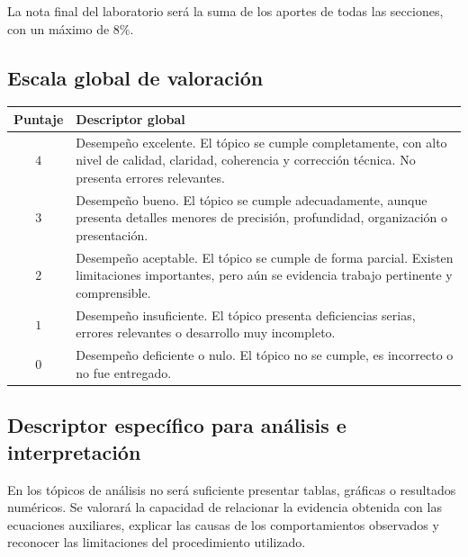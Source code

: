 \documentclass[12pt]{article}
\begin{document}
La nota final del laboratorio será la suma de los aportes de todas las secciones, con un máximo de \(8\%\).

\subsection*{Escala global de valoración}

\renewcommand{\arraystretch}{1.2}
\setlength{\tabcolsep}{4pt}

\begin{center}
\begin{tabular}{|c|p{12cm}|}
\hline
\textbf{Puntaje} & \textbf{Descriptor global} \\
\hline
\(4\) & Desempeño excelente. El tópico se cumple completamente, con alto nivel de calidad, claridad, coherencia y corrección técnica. No presenta errores relevantes. \\
\hline
\(3\) & Desempeño bueno. El tópico se cumple adecuadamente, aunque presenta detalles menores de precisión, profundidad, organización o presentación. \\
\hline
\(2\) & Desempeño aceptable. El tópico se cumple de forma parcial. Existen limitaciones importantes, pero aún se evidencia trabajo pertinente y comprensible. \\
\hline
\(1\) & Desempeño insuficiente. El tópico presenta deficiencias serias, errores relevantes o desarrollo muy incompleto. \\
\hline
\(0\) & Desempeño deficiente o nulo. El tópico no se cumple, es incorrecto o no fue entregado. \\
\hline
\end{tabular}
\end{center}

\subsection*{Descriptor específico para análisis e interpretación}

En los tópicos de análisis no será suficiente presentar tablas, gráficas o resultados numéricos. Se valorará la capacidad de relacionar la evidencia obtenida con las ecuaciones auxiliares, explicar las causas de los comportamientos observados y reconocer las limitaciones del procedimiento utilizado.
\end{document}
